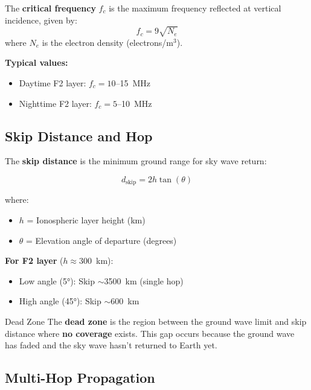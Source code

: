 \begin{keyconcept}
The \textbf{critical frequency} $f_c$ is the maximum frequency reflected at vertical incidence, given by:
\begin{equation}
\label{eq:critical-frequency}
f_c = 9\sqrt{N_e}
\end{equation}
where $N_e$ is the electron density (electrons/m$^3$).
\end{keyconcept}

\textbf{Typical values:}
\begin{itemize}
\item Daytime F2 layer: $f_c = 10$--15~MHz
\item Nighttime F2 layer: $f_c = 5$--10~MHz
\end{itemize}

\subsection{Skip Distance and Hop}

The \textbf{skip distance} is the minimum ground range for sky wave return:

\begin{equation}
\label{eq:skip-distance}
d_{\text{skip}} = 2h\tan(\theta)
\end{equation}

where:
\begin{itemize}
\item $h$ = Ionospheric layer height (km)
\item $\theta$ = Elevation angle of departure (degrees)
\end{itemize}

\textbf{For F2 layer} ($h \approx 300$~km):
\begin{itemize}
\item Low angle (5°): Skip $\sim$3500~km (single hop)
\item High angle (45°): Skip $\sim$600~km
\end{itemize}

\begin{importantbox}{Dead Zone}
The \textbf{dead zone} is the region between the ground wave limit and skip distance where \textbf{no coverage} exists. This gap occurs because the ground wave has faded and the sky wave hasn't returned to Earth yet.
\end{importantbox}

\subsection{Multi-Hop Propagation}

